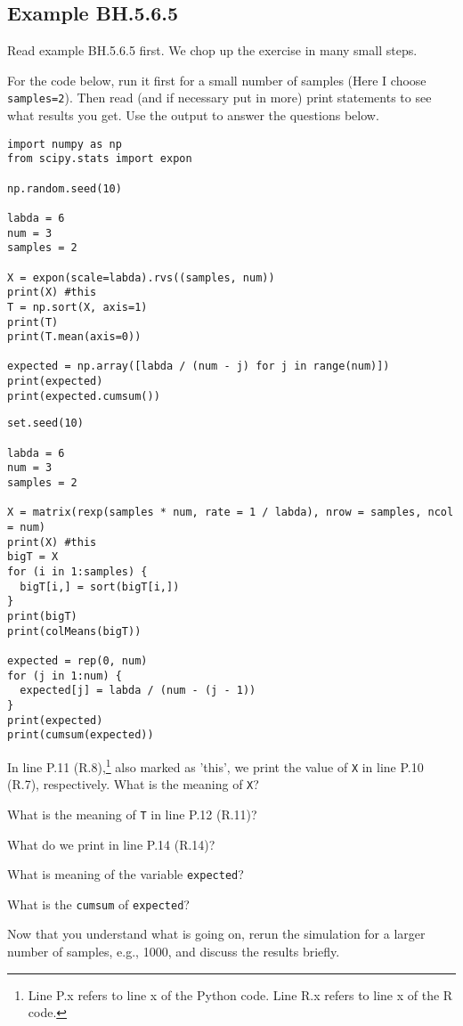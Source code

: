 \subsection{Example BH.5.6.5}
Read example  BH.5.6.5 first.
We chop up the exercise in many small steps.


For the code below, run it first for a small number of samples (Here I choose \texttt{samples=2}). Then read (and if necessary put in more) print statements to see what results you get.  Use the output to answer the questions below.

\begin{verbatim}
import numpy as np
from scipy.stats import expon

np.random.seed(10)

labda = 6
num = 3
samples = 2

X = expon(scale=labda).rvs((samples, num))
print(X) #this
T = np.sort(X, axis=1)
print(T)
print(T.mean(axis=0))

expected = np.array([labda / (num - j) for j in range(num)])
print(expected)
print(expected.cumsum())
\end{verbatim}


\begin{verbatim}
set.seed(10)

labda = 6
num = 3
samples = 2

X = matrix(rexp(samples * num, rate = 1 / labda), nrow = samples, ncol = num)
print(X) #this
bigT = X
for (i in 1:samples) {
  bigT[i,] = sort(bigT[i,])
}
print(bigT)
print(colMeans(bigT))

expected = rep(0, num)
for (j in 1:num) {
  expected[j] = labda / (num - (j - 1))
}
print(expected)
print(cumsum(expected))
\end{verbatim}



\begin{exercise}
In line P.11 (R.8),\footnote{Line P.x refers to line x of the Python code.
  Line R.x refers to line x of the R code.}
also marked as 'this', we print the value of \texttt{X} in line P.10 (R.7), respectively.
What is the meaning of \texttt{X}?
\end{exercise}

\begin{exercise}
What is the meaning of \texttt{T} in line P.12 (R.11)?
\end{exercise}


\begin{exercise}
What do we print in line P.14 (R.14)?
\end{exercise}

\begin{exercise}
What is meaning of the variable \texttt{expected}?
\end{exercise}

\begin{exercise}
 What is the \texttt{cumsum} of \texttt{expected}?
\end{exercise}

\begin{exercise}
 Now that you understand what is going on, rerun the simulation for a larger number of samples, e.g., 1000, and discuss the results briefly.
\end{exercise}
